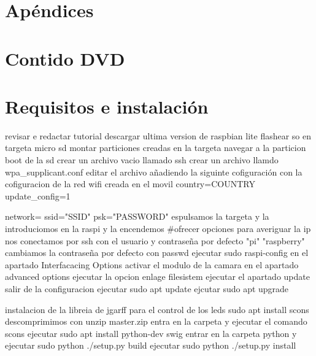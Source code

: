 \newpage
\chapter*{Apéndices}
\thispagestyle{empty}

\chapter{Contido DVD}

\chapter{Requisitos e instalación}
revisar e redactar tutorial
descargar ultima version de raspbian lite
flashear so en targeta micro sd
montar particiones creadas en la targeta
navegar a la particion boot de la sd
crear un archivo vacio llamado ssh
crear un archivo llamdo wpa_supplicant.conf
editar el archivo añadiendo la siguinte cofiguración con la cofiguracion de la red wifi creada en el movil
	country=COUNTRY
	update_config=1

	network={
	       ssid="SSID"
	       psk="PASSWORD"
	    }
espulsamos la targeta y la introduciomos en la raspi y la encendemos
#ofrecer opciones para averiguar la ip
nos conectamos por ssh con el usuario y contraseña por defecto "pi" "raspberry"
cambiamos la contraseña por defecto con passwd
ejecutar sudo raspi-config
en el apartado Interfacacing Options activar el modulo de la camara
en el apartado advanced options ejecutar la opcion enlage filesistem
ejecutar el apartado update
salir de la configuracion
ejecutar sudo apt update
ejcutar sudo apt upgrade

instalacion de la libreia de jgarff para el control de los leds
sudo apt install scons
descomprimimos con unzip master.zip
entra en la carpeta y ejecutar el comando scons
ejecutar sudo apt install python-dev swig
entrar en la carpeta python y ejecutar sudo python ./setup.py build
ejecutar sudo python ./setup.py install

\newpage
\thispagestyle{empty}
